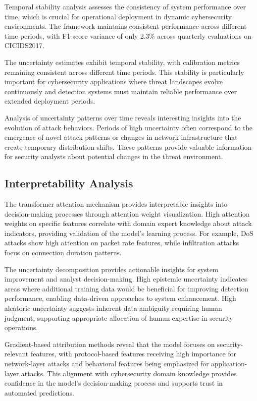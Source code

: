 \documentclass[journal]{IEEEtran}
\begin{document}
Temporal stability analysis assesses the consistency of system performance over time, which is crucial for operational deployment in dynamic cybersecurity environments. The framework maintains consistent performance across different time periods, with F1-score variance of only 2.3\% across quarterly evaluations on CICIDS2017.

The uncertainty estimates exhibit temporal stability, with calibration metrics remaining consistent across different time periods. This stability is particularly important for cybersecurity applications where threat landscapes evolve continuously and detection systems must maintain reliable performance over extended deployment periods.

Analysis of uncertainty patterns over time reveals interesting insights into the evolution of attack behaviors. Periods of high uncertainty often correspond to the emergence of novel attack patterns or changes in network infrastructure that create temporary distribution shifts. These patterns provide valuable information for security analysts about potential changes in the threat environment.

\subsection{Interpretability Analysis}

The transformer attention mechanism provides interpretable insights into decision-making processes through attention weight visualization. High attention weights on specific features correlate with domain expert knowledge about attack indicators, providing validation of the model's learning process. For example, DoS attacks show high attention on packet rate features, while infiltration attacks focus on connection duration patterns.

The uncertainty decomposition provides actionable insights for system improvement and analyst decision-making. High epistemic uncertainty indicates areas where additional training data would be beneficial for improving detection performance, enabling data-driven approaches to system enhancement. High aleatoric uncertainty suggests inherent data ambiguity requiring human judgment, supporting appropriate allocation of human expertise in security operations.

Gradient-based attribution methods reveal that the model focuses on security-relevant features, with protocol-based features receiving high importance for network-layer attacks and behavioral features being emphasized for application-layer attacks. This alignment with cybersecurity domain knowledge provides confidence in the model's decision-making process and supports trust in automated predictions.
\end{document}
